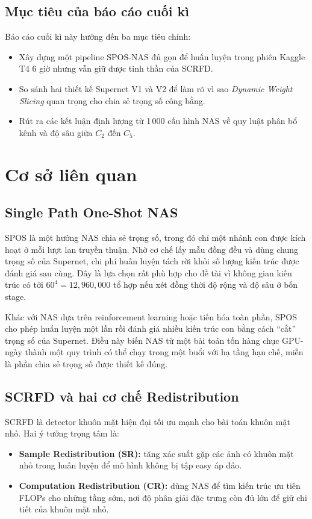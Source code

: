 \section{Mục tiêu của báo cáo cuối kì}

Báo cáo cuối kì này hướng đến ba mục tiêu chính:
\begin{itemize}
  \item Xây dựng một pipeline SPOS-NAS đủ gọn để huấn luyện trong phiên Kaggle T4 6 giờ nhưng vẫn giữ được tinh thần của SCRFD.
  \item So sánh hai thiết kế Supernet V1 và V2 để làm rõ vì sao \textit{Dynamic Weight Slicing} quan trọng cho chia sẻ trọng số công bằng.
  \item Rút ra các kết luận định lượng từ 1\,000 cấu hình NAS về quy luật phân bổ kênh và độ sâu giữa \(C_2\) đến \(C_5\).
\end{itemize}

\chapter{Cơ sở liên quan}

\section{Single Path One-Shot NAS}

SPOS là một hướng NAS chia sẻ trọng số, trong đó chỉ một nhánh con được kích hoạt ở mỗi lượt lan truyền thuận. Nhờ cơ chế lấy mẫu đồng đều và dùng chung trọng số của Supernet, chi phí huấn luyện tách rời khỏi số lượng kiến trúc được đánh giá sau cùng. Đây là lựa chọn rất phù hợp cho đề tài vì không gian kiến trúc có tới \(60^4 = 12{,}960{,}000\) tổ hợp nếu xét đồng thời độ rộng và độ sâu ở bốn stage. \cite{guo2020spos}

Khác với NAS dựa trên reinforcement learning hoặc tiến hóa toàn phần, SPOS cho phép huấn luyện một lần rồi đánh giá nhiều kiến trúc con bằng cách ``cắt'' trọng số của Supernet. Điều này biến NAS từ một bài toán tốn hàng chục GPU-ngày thành một quy trình có thể chạy trong một buổi với hạ tầng hạn chế, miễn là phần chia sẻ trọng số được thiết kế đúng.

\section{SCRFD và hai cơ chế Redistribution}

SCRFD là detector khuôn mặt hiện đại tối ưu mạnh cho bài toán khuôn mặt nhỏ. Hai ý tưởng trọng tâm là:
\begin{itemize}
  \item \textbf{Sample Redistribution (SR):} tăng xác suất gặp các ảnh có khuôn mặt nhỏ trong huấn luyện để mô hình không bị tập easy áp đảo.
  \item \textbf{Computation Redistribution (CR):} dùng NAS để tìm kiến trúc ưu tiên FLOPs cho những tầng sớm, nơi độ phân giải đặc trưng còn đủ lớn để giữ chi tiết của khuôn mặt nhỏ. \cite{guo2022scrfd}
\end{itemize}

